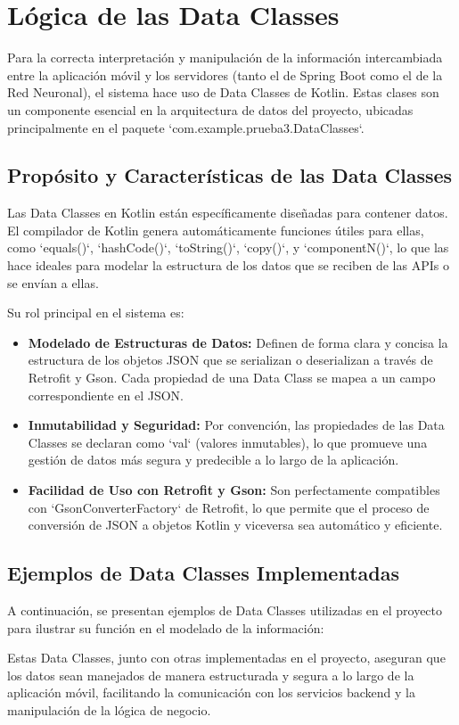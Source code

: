 \section{Lógica de las Data Classes}

Para la correcta interpretación y manipulación de la información intercambiada entre la aplicación móvil y los servidores (tanto el de Spring Boot como el de la Red Neuronal), el sistema hace uso de Data Classes de Kotlin. Estas clases son un componente esencial en la arquitectura de datos del proyecto, ubicadas principalmente en el paquete `com.example.prueba3.DataClasses`.

\subsection{Propósito y Características de las Data Classes}

Las Data Classes en Kotlin están específicamente diseñadas para contener datos. El compilador de Kotlin genera automáticamente funciones útiles para ellas, como `equals()`, `hashCode()`, `toString()`, `copy()`, y `componentN()`, lo que las hace ideales para modelar la estructura de los datos que se reciben de las APIs o se envían a ellas.

Su rol principal en el sistema es:
\begin{itemize}
	\item \textbf{Modelado de Estructuras de Datos:} Definen de forma clara y concisa la estructura de los objetos JSON que se serializan o deserializan a través de Retrofit y Gson. Cada propiedad de una Data Class se mapea a un campo correspondiente en el JSON.
	\item \textbf{Inmutabilidad y Seguridad:} Por convención, las propiedades de las Data Classes se declaran como `val` (valores inmutables), lo que promueve una gestión de datos más segura y predecible a lo largo de la aplicación.
	\item \textbf{Facilidad de Uso con Retrofit y Gson:} Son perfectamente compatibles con `GsonConverterFactory` de Retrofit, lo que permite que el proceso de conversión de JSON a objetos Kotlin y viceversa sea automático y eficiente.
\end{itemize}

\subsection{Ejemplos de Data Classes Implementadas}

A continuación, se presentan ejemplos de Data Classes utilizadas en el proyecto para ilustrar su función en el modelado de la información:


Estas Data Classes, junto con otras implementadas en el proyecto, aseguran que los datos sean manejados de manera estructurada y segura a lo largo de la aplicación móvil, facilitando la comunicación con los servicios backend y la manipulación de la lógica de negocio.